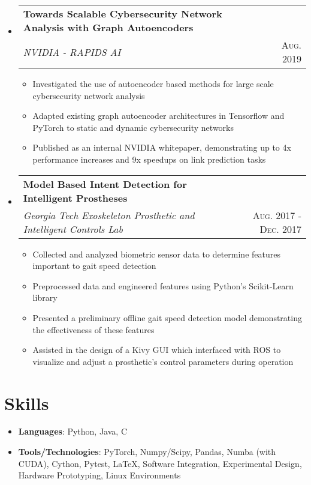\documentclass[letterpaper,11pt]{article}
\makeatletter
\newcommand{\resumeItem}[2]{
  \item\small{
    \textbf{#1}{: #2 \vspace{-2pt}}
  }
}
\newcommand{\resumePlainItem}[1]{
  \item\small{#1 \vspace{-2pt}}
}
\newcommand{\resumeSubheading}[4]{
  \vspace{-1pt}\item[]
    \begin{tabular*}{0.97\textwidth}{l@{\extracolsep{\fill}}r}
      \textbf{#1} & #2 \\
      \textit{\small#3} & \textsc{\small #4} \\ %
    \end{tabular*}\vspace{-5pt}
}
\newcommand{\resumeSubHeadingListStart}{\begin{itemize}[leftmargin=*]}
\newcommand{\resumeSubHeadingListEnd}{\end{itemize}}
\newcommand{\resumeItemListStart}{\begin{itemize}}
\newcommand{\resumeItemListEnd}{\end{itemize}\vspace{-5pt}}
\newenvironment{resumeItemList}{\resumeItemListStart}{\resumeItemListEnd}
\newenvironment{resumeSubheadingList}{\resumeSubHeadingListStart}{\resumeSubHeadingListEnd}
\makeatother
\begin{document}
\begin{resumeSubheadingList}
    \resumeSubheading
    {Towards Scalable Cybersecurity Network Analysis with Graph Autoencoders}{}
    {NVIDIA - RAPIDS AI}{Aug. 2019}
    \begin{resumeItemList}
      \resumePlainItem{Investigated the use of autoencoder based methods for large scale cybersecurity network analysis}
      \resumePlainItem{Adapted existing graph autoencoder architectures in Tensorflow and PyTorch to static and dynamic
      cybersecurity networks}
      \resumePlainItem{Published as an internal NVIDIA whitepaper, demonstrating up to 4x performance increases and 
      9x speedups on link prediction tasks}
    \end{resumeItemList}

    \resumeSubheading
    {Model Based Intent Detection for Intelligent Prostheses}{}
    {Georgia Tech Exoskeleton Prosthetic and Intelligent Controls Lab}{Aug. 2017 - Dec. 2017}
    \begin{resumeItemList}
      \resumePlainItem{Collected and analyzed biometric sensor data to determine features important to gait
      speed detection}
      \resumePlainItem{Preprocessed data and engineered features using Python's Scikit-Learn library} %
      \resumePlainItem{Presented a preliminary offline gait speed detection model demonstrating the effectiveness of these features}
      \resumePlainItem{Assisted in the design of a Kivy GUI which interfaced with ROS to visualize and adjust a prosthetic's control
      parameters during operation}
    \end{resumeItemList}
  \end{resumeSubheadingList}
\section{Skills}
  \begin{resumeItemList}
    \resumeItem{Languages}{Python, Java, C}
    \resumeItem{Tools/Technologies}{PyTorch, Numpy/Scipy, Pandas, Numba (with CUDA), Cython, Pytest, \LaTeX,
                                    Software Integration, Experimental Design, Hardware Prototyping, Linux Environments} %
  \end{resumeItemList}
\end{document}
